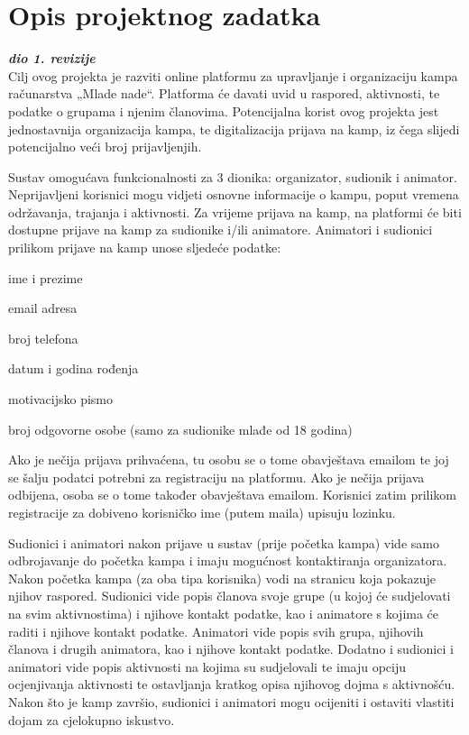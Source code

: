 \chapter{Opis projektnog zadatka}
		
		\textbf{\textit{dio 1. revizije}}\\
		
		Cilj ovog projekta je razviti online platformu za upravljanje i organizaciju kampa računarstva „Mlade nade“. Platforma će davati uvid u raspored, aktivnosti, te podatke o grupama i njenim članovima. Potencijalna korist ovog projekta jest jednostavnija organizacija kampa, te digitalizacija prijava na kamp, iz čega slijedi potencijalno veći broj prijavljenjih.
		
		Sustav omogućava funkcionalnosti za 3 dionika: organizator, sudionik i animator. Neprijavljeni korisnici mogu vidjeti osnovne informacije o kampu, poput vremena održavanja, trajanja i aktivnosti. Za vrijeme prijava na kamp, na platformi će biti dostupne prijave na kamp za sudionike i/ili animatore. Animatori i sudionici prilikom prijave na kamp unose sljedeće podatke:
		\begin{packed_item}
			\item ime i prezime
			\item email adresa
			\item broj telefona
			\item datum i godina rođenja
			\item motivacijsko pismo
			\item broj odgovorne osobe (samo za sudionike mlađe od 18 godina)
		\end{packed_item}
	
		Ako je nečija prijava prihvaćena, tu osobu se o tome obavještava emailom te joj se šalju podatci potrebni za registraciju na platformu. Ako je nečija prijava odbijena, osoba se o tome također obavještava emailom. Korisnici zatim prilikom registracije za dobiveno korisničko ime (putem maila) upisuju lozinku.
		
		Sudionici i animatori nakon prijave u sustav (prije početka kampa) vide samo odbrojavanje do početka kampa i imaju mogućnost kontaktiranja organizatora. Nakon početka kampa (za oba tipa korisnika) vodi na stranicu koja pokazuje njihov raspored. Sudionici vide popis članova svoje grupe (u kojoj će sudjelovati na svim aktivnostima) i njihove kontakt podatke, kao i animatore s kojima će raditi i njihove kontakt podatke. Animatori vide popis svih grupa, njihovih članova i drugih animatora, kao i njihove kontakt podatke. Dodatno i sudionici i animatori vide popis aktivnosti na kojima su sudjelovali te imaju opciju ocjenjivanja aktivnosti te ostavljanja kratkog opisa njihovog dojma s aktivnošću. Nakon što je kamp završio, sudionici i animatori mogu ocijeniti i ostaviti vlastiti dojam za cjelokupno iskustvo. 
		
